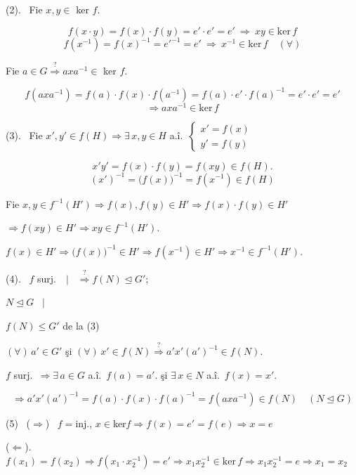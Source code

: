 \bigskip
\noindent (2). \ Fie $x,y\in$ ker $f$.

\[
f(x\cdot y) = f(x)\cdot f(y) = e'\cdot e' = e' \ \Rightarrow \ xy\in\text{ker}\,f
\]
\[
f(x^{-1}) = f(x)^{-1} = e'^{-1} = e' \ \Rightarrow \ x^{-1}\in\text{ker}\,f \quad (\forall)
\]

\bigskip
\noindent Fie $a\in G \overset{?}{\Rightarrow} axa^{-1}\in$ ker $f$.

\[
f(axa^{-1}) = f(a)\cdot f(x)\cdot f(a^{-1}) = f(a)\cdot e'\cdot f(a)^{-1} = e'\cdot e' = e'
\]
\[
\Rightarrow axa^{-1}\in\text{ker}\,f
\]

\bigskip
\noindent (3). \ Fie $x',y'\in f(H) \Rightarrow \exists\,x,y\in H$ a.î.\ $\begin{cases}x'=f(x)\\y'=f(y)\end{cases}$

\[
x'y' = f(x)\cdot f(y) = f(xy) \in f(H).
\]
\[
(x')^{-1} = \big(f(x)\big)^{-1} = f(x^{-1}) \in f(H)
\]

\bigskip
\noindent Fie $x,y\in f^{-1}(H') \Rightarrow f(x),f(y)\in H' \Rightarrow f(x)\cdot f(y)\in H'$

\noindent $\Rightarrow f(xy)\in H' \Rightarrow xy\in f^{-1}(H')$.

\noindent $f(x)\in H' \Rightarrow \big(f(x)\big)^{-1}\in H' \Rightarrow f(x^{-1})\in H' \Rightarrow x^{-1}\in f^{-1}(H')$.

\bigskip
\noindent (4). \ $f$ surj.\ \ $\Big|$ \ $\overset{?}{\Rightarrow} f(N)\trianglelefteq G'$;

\noindent $N\trianglelefteq G$ \ $\Big|$

\noindent $f(N)\leq G'$ de la (3)

\bigskip
\noindent $(\forall)\,a'\in G'$ şi $(\forall)\,x'\in f(N) \overset{?}{\Rightarrow} a'x'(a')^{-1}\in f(N)$.

\noindent $f$ surj.\ $\Rightarrow \exists\,a\in G$ a.î.\ $f(a)=a'$. \quad şi $\exists\,x\in N$ a.î.\ $f(x)=x'$.

\[
\Rightarrow a'x'(a')^{-1} = f(a)\cdot f(x)\cdot f(a)^{-1} = f(axa^{-1}) \in f(N) \quad (N\trianglelefteq G)
\]

\bigskip
\noindent (5) \ ($\Rightarrow$) \ $f=$inj., $x\in$ker$f \Rightarrow f(x)=e'=f(e) \Rightarrow x=e$

\noindent ($\Leftarrow$). \ $f(x_1)=f(x_2) \Rightarrow f(x_1\cdot x_2^{-1})=e' \Rightarrow x_1x_2^{-1}\in\text{ker}\,f \Rightarrow x_1x_2^{-1}=e \Rightarrow x_1=x_2$



